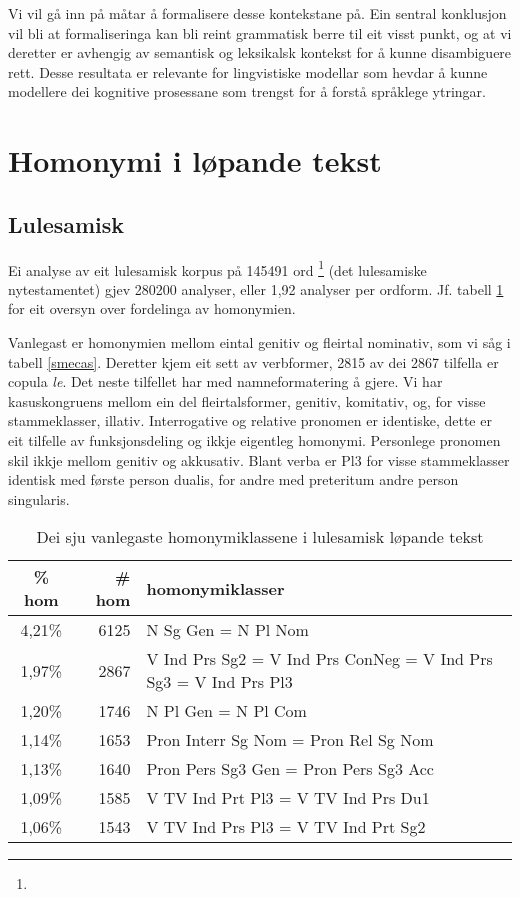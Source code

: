 \documentclass[a4paper,norsk]{article}
\begin{document}
Vi vil gå inn på måtar å formalisere desse kontekstane på. Ein sentral konklusjon vil bli at formaliseringa kan bli reint grammatisk berre til eit visst punkt, og at vi deretter er avhengig av semantisk og leksikalsk kontekst for å kunne disambiguere rett. Desse resultata er relevante for lingvistiske modellar som hevdar å kunne modellere dei kognitive prosessane som trengst for å forstå språklege ytringar.%


\section{Homonymi i løpande tekst}



\subsection{Lulesamisk} 
 
Ei analyse av eit lulesamisk korpus på 145491 ord \footnote{} (det lulesamiske nytestamentet) gjev 280200 analyser, eller 1,92 analyser per ordform. Jf. tabell \ref{smjhom} for eit oversyn over fordelinga av homonymien.%

Vanlegast er homonymien mellom eintal genitiv og fleirtal nominativ, som vi såg i tabell \ref{smecas}. Deretter kjem eit sett av verbformer, 2815 av dei 2867 tilfella er copula \textit{le}. Det neste tilfellet har med namneformatering å gjere. Vi har kasuskongruens mellom ein del fleirtalsformer, genitiv, komitativ, og, for visse stammeklasser, illativ. Interrogative og relative pronomen er identiske, dette er eit tilfelle av funksjonsdeling og ikkje eigentleg homonymi. Personlege pronomen skil ikkje mellom genitiv og akkusativ. Blant verba er Pl3 for visse stammeklasser identisk med første person dualis, for andre med preteritum andre person singularis.%

\begin{table}[htdp]
\caption{Dei sju vanlegaste homonymiklassene i lulesamisk løpande tekst}
\begin{center}
\begin{tabular}{|c|r|l|}
\hline
\% hom & \# hom & homonymiklasser \\
\hline
4,21\% & 6125 & N Sg Gen  =  N Pl Nom  \\
1,97\% & 2867 & V Ind Prs Sg2  =  V Ind Prs ConNeg  =  V Ind Prs Sg3  =  V Ind Prs Pl3  \\
1,20\% & 1746 & N Pl Gen  =  N Pl Com  \\
1,14\% & 1653 & Pron Interr Sg Nom  =  Pron Rel Sg Nom  \\
1,13\% & 1640 & Pron Pers Sg3 Gen  =  Pron Pers Sg3 Acc  \\
1,09\% & 1585 & V TV Ind Prt Pl3  =  V TV Ind Prs Du1  \\
1,06\% & 1543 & V TV Ind Prs Pl3  =  V TV Ind Prt Sg2  \\
\hline
\end{tabular}
\end{center}
\label{smjhom}
\end{table}%
\end{document}
